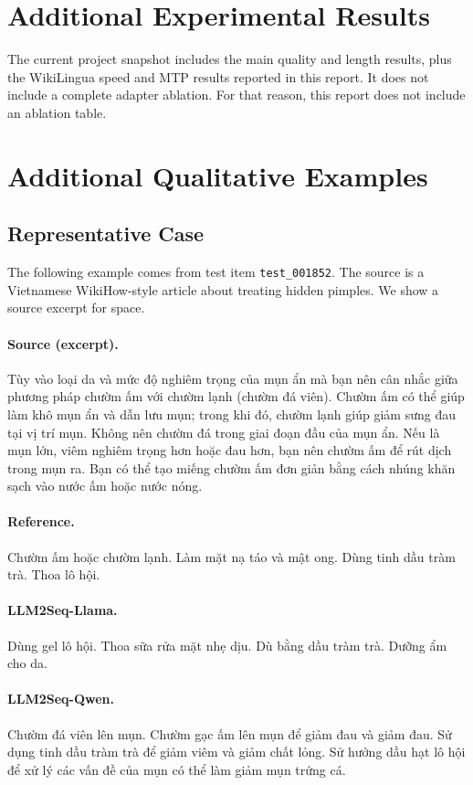 \documentclass[11pt]{article}
\begin{document}
\section{Additional Experimental Results}

The current project snapshot includes the main quality and length results, plus the WikiLingua speed and MTP results reported in this report.
It does not include a complete adapter ablation.
For that reason, this report does not include an ablation table.

\section{Additional Qualitative Examples}
\label{app:qualitative}

\subsection{Representative Case}

The following example comes from test item \texttt{test\_001852}.
The source is a Vietnamese WikiHow-style article about treating hidden pimples.
We show a source excerpt for space.

\paragraph{Source (excerpt).}
Tùy vào loại da và mức độ nghiêm trọng của mụn ẩn mà bạn nên cân nhắc giữa phương pháp chườm ấm với chườm lạnh (chườm đá viên).
Chườm ấm có thể giúp làm khô mụn ẩn và dẫn lưu mụn; trong khi đó, chườm lạnh giúp giảm sưng đau tại vị trí mụn.
Không nên chườm đá trong giai đoạn đầu của mụn ẩn.
Nếu là mụn lớn, viêm nghiêm trọng hơn hoặc đau hơn, bạn nên chườm ấm để rút dịch trong mụn ra.
Bạn có thể tạo miếng chườm ấm đơn giản bằng cách nhúng khăn sạch vào nước ấm hoặc nước nóng.

\paragraph{Reference.}
Chườm ấm hoặc chườm lạnh.
Làm mặt nạ táo và mật ong.
Dùng tinh dầu tràm trà.
Thoa lô hội.

\paragraph{LLM2Seq-Llama.}
Dùng gel lô hội.
Thoa sữa rửa mặt nhẹ dịu.
Dù bằng dầu tràm trà.
Dưỡng ẩm cho da.

\paragraph{LLM2Seq-Qwen.}
Chườm đá viên lên mụn.
Chườm gạc ấm lên mụn để giảm đau và giảm đau.
Sử dụng tinh dầu tràm trà để giảm viêm và giảm chất lỏng.
Sử hưởng dầu hạt lô hội để xử lý các vấn đề của mụn có thể làm giảm mụn trứng cá.
\end{document}
